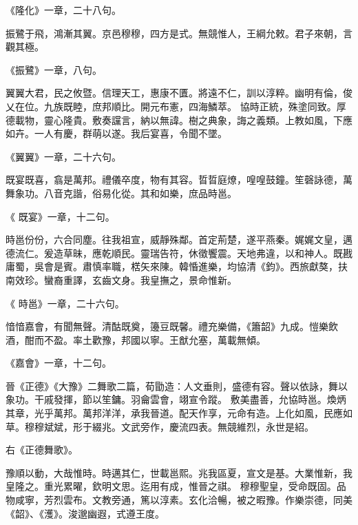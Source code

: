 \begin{pinyinscope}
《隆化》一章，二十八句。



 振鷺于飛，鴻漸其翼。京邑穆穆，四方是式。無競惟人，王綱允敕。君子來朝，言觀其極。


《振鷺》一章，八句。



 翼翼大君，民之攸暨。信理天工，惠康不匱。將遠不仁，訓以淳粹。幽明有倫，俊乂在位。九族既睦，庶邦順比。開元布憲，四海鱗萃。
 協時正統，殊塗同致。厚德載物，靈心隆貴。敷奏讜言，納以無諱。樹之典象，誨之義類。上教如風，下應如卉。一人有慶，群萌以遂。我后宴喜，令聞不墜。


《翼翼》一章，二十六句。



 既宴既喜，翕是萬邦。禮儀卒度，物有其容。晢晢庭燎，喤喤鼓鐘。笙磬詠德，萬舞象功。八音克諧，俗易化從。其和如樂，庶品時邕。


《
 既宴》一章，十二句。



 時邕份份，六合同塵。往我祖宣，威靜殊鄰。首定荊楚，遂平燕秦。娓娓文皇，邁德流仁。爰造草昧，應乾順民。靈瑞告符，休徵饗震。天地弗違，以和神人。既戡庸蜀，吳會是賓。肅慎率職，楛矢來陳。韓惛進樂，均協清《鈞》。西旅獻獒，扶南效珍。蠻裔重譯，玄齒文身。我皇撫之，景命惟新。


《
 時邕》一章，二十六句。



 愔愔嘉會，有聞無聲。清酤既奠，籩豆既馨。禮充樂備，《簫韶》九成。愷樂飲酒，酣而不盈。率土歡豫，邦國以寧。王猷允塞，萬載無傾。



 《嘉會》一章，十二句。



 晉《正德》《大豫》二舞歌二篇，荀勖造：人文垂則，盛德有容。聲以依詠，舞以象功。干戚發揮，節以笙鏞。羽龠雲會，翊宣令蹤。
 敷美盡善，允協時邕。煥炳其章，光乎萬邦。萬邦洋洋，承我晉道。配天作享，元命有造。上化如風，民應如草。穆穆斌斌，形于綴兆。文武旁作，慶流四表。無競維烈，永世是紹。



 右《正德舞歌》。



 豫順以動，大哉惟時。時邁其仁，世載邕熙。兆我區夏，宣文是基。大業惟新，我皇隆之。重光累曜，欽明文思。迄用有成，惟晉之祺。
 穆穆聖皇，受命既固。品物咸寧，芳烈雲布。文教旁通，篤以淳素。玄化洽暢，被之暇豫。作樂崇德，同美《韶》、《濩》。浚邈幽遐，式遵王度。




\end{pinyinscope}
